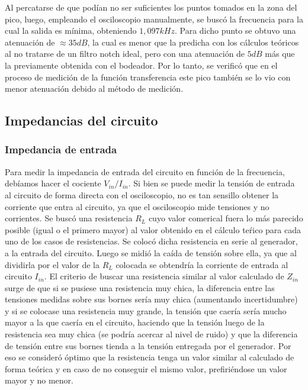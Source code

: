 Al percatarse de que pod\'ian no ser suficientes los puntos tomados en la zona del pico, luego, empleando el osciloscopio manualmente, se busc\'o la frecuencia para la cual la salida es m\'inima, obteniendo $1,097kHz$. Para dicho punto se obtuvo una atenuaci\'on de $\approx35dB$, la cual es menor que la predicha con los c\'alculos te\'oricos al no tratarse de un filtro notch ideal, pero con una atenuaci\'on de $5dB$ m\'as que la previamente obtenida con el bodeador. Por lo tanto, se verific\'o que en el proceso de medici\'on de la funci\'on transferencia este pico tambi\'en se lo vio con menor atenuaci\'on debido al m\'etodo de medici\'on.


\subsection{Impedancias del circuito}

\subsubsection{Impedancia de entrada}
Para medir la impedancia de entrada del circuito en funci\'on de la frecuencia, 
deb\'iamos hacer el cociente $V_{in}/I_{in}$. Si bien se puede medir la tensi\'on 
de entrada al circuito de forma directa con el osciloscopio, 
no es tan sensillo obtener la corriente que entra al circuito, ya que el osciloscopio 
mide tensiones y no corrientes. Se busc\'o una resistencia $R_L$ cuyo valor comerical 
fuera lo m\'as parecido posible (igual o el primero mayor) al valor obtenido en 
el c\'alculo te\'rico para cada uno de los casos de resistencias. Se coloc\'o dicha 
resistencia en serie al generador, a la entrada del circuito. Luego se midi\'o la ca\'ida 
de tensi\'on sobre ella, ya que al dividirla por el valor de la $R_L$ colocada se obtendr\'ia 
la corriente de entrada al circuito $I_{in}$. El criterio de buscar una resistencia similar 
al valor calculado de $Z_{in}$ surge de que si se pusiese una resistencia muy chica, 
la diferencia entre las tensiones medidas sobre sus bornes ser\'ia muy chica 
(aumentando incertidumbre) y si se colocase una resistencia muy grande, 
la tensi\'on que caer\'ia ser\'ia mucho mayor a la que caer\'ia en el circuito, 
haciendo que la tensi\'on luego de la resistencia sea muy chica (se podr\'ia 
acercar al nivel de ruido) y que la diferencia de tensi\'on entre sus bornes tienda 
a la tensi\'on entregada por el generador. Por eso se consider\'o \'optimo que la 
resistencia tenga un valor similar al calculado de forma te\'orica y en caso de no 
conseguir el mismo valor, prefiri\'endose un valor mayor y no menor. 

